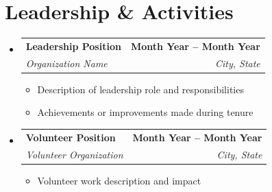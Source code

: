 \documentclass[letterpaper,11pt]{article}
\makeatletter
\newcommand{\resumeItem}[1]{
  \item\small{
    {#1 \vspace{-2pt}}
  }
}
\newcommand{\resumeSubheading}[4]{
  \vspace{-2pt}\item
    \begin{tabular*}{1.0\textwidth}[t]{l@{\extracolsep{\fill}}r}
      \textbf{#1} & \textbf{\small #2} \\
      \textit{\small#3} & \textit{\small #4} \\
    \end{tabular*}\vspace{-7pt}
}
\newcommand{\resumeSubHeadingListStart}{\begin{itemize}[leftmargin=0.0in, label={}]}
\newcommand{\resumeSubHeadingListEnd}{\end{itemize}}
\newcommand{\resumeItemListStart}{\begin{itemize}}
\newcommand{\resumeItemListEnd}{\end{itemize}\vspace{-5pt}}
\makeatother
\begin{document}
\section{Leadership \& Activities}
    \resumeSubHeadingListStart
        \resumeSubheading
          {Leadership Position}{Month Year -- Month Year}
          {Organization Name}{City, State}
          \resumeItemListStart
            \resumeItem{Description of leadership role and responsibilities}
            \resumeItem{Achievements or improvements made during tenure}
          \resumeItemListEnd
        
        \resumeSubheading
          {Volunteer Position}{Month Year -- Month Year}
          {Volunteer Organization}{City, State}
          \resumeItemListStart
            \resumeItem{Volunteer work description and impact}
          \resumeItemListEnd
    \resumeSubHeadingListEnd
\end{document}
